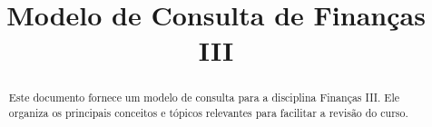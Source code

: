 \documentclass{sciposter}
\title{Modelo de Consulta de Finanças III}
\institute 
{Bacharelado em Economia\\
Insper - Instituto de Ensino e Pesquisa\\
São Paulo, Brasil}
\begin{document}

\maketitle

\begin{multicols}{3}

\begin{abstract}
Este documento fornece um modelo de consulta para a disciplina Finanças III. Ele organiza os principais conceitos e tópicos relevantes para facilitar a revisão do curso.
\end{abstract}

\end{multicols}
\end{document}
